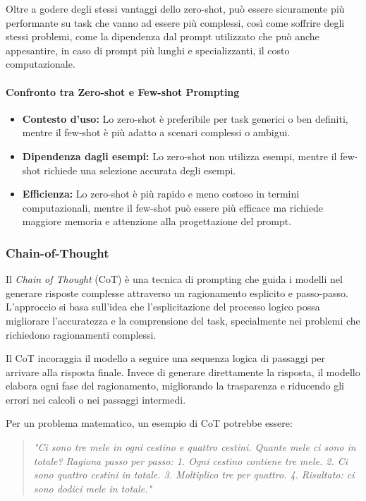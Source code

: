 \documentclass[../main.tex]{subfiles}
\begin{document}
Oltre a godere degli stessi vantaggi dello zero-shot, può essere sicuramente più performante su task che vanno ad essere più complessi, così come soffrire degli stessi problemi, come la dipendenza dal prompt utilizzato che può anche appesantire, in caso di prompt più lunghi e specializzanti, il costo computazionale.

\paragraph{Confronto tra Zero-shot e Few-shot Prompting}

\begin{itemize}
    \item \textbf{Contesto d'uso:} Lo zero-shot è preferibile per task generici o ben definiti, mentre il few-shot è più adatto a scenari complessi o ambigui.
    \item \textbf{Dipendenza dagli esempi:} Lo zero-shot non utilizza esempi, mentre il few-shot richiede una selezione accurata degli esempi.
    \item \textbf{Efficienza:} Lo zero-shot è più rapido e meno costoso in termini computazionali, mentre il few-shot può essere più efficace ma richiede maggiore memoria e attenzione alla progettazione del prompt.
\end{itemize}

\subsubsection{Chain-of-Thought}

Il \textit{Chain of Thought} (CoT) è una tecnica di prompting che guida i modelli nel generare risposte complesse attraverso un ragionamento esplicito e passo-passo. L'approccio si basa sull'idea che l'esplicitazione del processo logico possa migliorare l'accuratezza e la comprensione del task, specialmente nei problemi che richiedono ragionamenti complessi.

Il CoT incoraggia il modello a seguire una sequenza logica di passaggi per arrivare alla risposta finale. Invece di generare direttamente la risposta, il modello elabora ogni fase del ragionamento, migliorando la trasparenza e riducendo gli errori nei calcoli o nei passaggi intermedi.

Per un problema matematico, un esempio di CoT potrebbe essere:
\begin{quote}
    \textit{"Ci sono tre mele in ogni cestino e quattro cestini. Quante mele ci sono in totale?  
    Ragiona passo per passo:  
    1. Ogni cestino contiene tre mele.  
    2. Ci sono quattro cestini in totale.  
    3. Moltiplico tre per quattro.  
    4. Risultato: ci sono dodici mele in totale."}
\end{quote}
\end{document}
